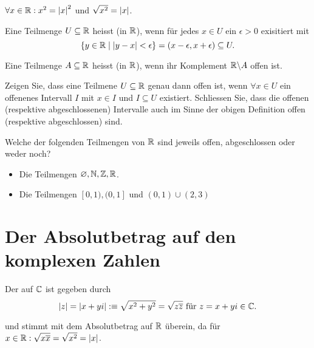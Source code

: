 \begin{ex} $\forall x \in \mathbb{R}: x^2 = \left|x\right|^2$ und $\sqrt{x^2} = \left|x\right|$.
\end{ex}

\begin{mydef}
  Eine Teilmenge $U \subseteq \mathbb{R}$ heisst  (in $\mathbb{R}$), wenn für jedes $x \in U$ ein $\epsilon >0$ exisitiert mit
  \[
    \{ y \in \mathbb{R} \mid \left|y-x\right| < \epsilon \} = (x-\epsilon, x + \epsilon) \subseteq U.
  \]

  Eine Teilmenge $A \subseteq \mathbb{R}$ heisst  (in $\mathbb{R}$), wenn ihr Komplement $\mathbb{R} \backslash A$ offen ist.
\end{mydef}

\begin{ex}
  Zeigen Sie, dass eine Teilmene $U \subseteq \mathbb{R}$ genau dann offen ist, wenn $\forall x \in U$ ein offenenes Intervall $I$ mit $x \in I$ und $I \subseteq U$ existiert. Schliessen Sie, dass die offenen (respektive abgeschlossenen) Intervalle auch im Sinne der obigen Definition offen (respektive abgeschlossen) sind.
\end{ex}

\begin{ex}
  Welche der folgenden Teilmengen von $\mathbb{R}$ sind jeweils offen, abgeschlossen oder weder noch?
  \begin{itemize}
    \item Die Teilmengen $\varnothing, \mathbb{N}, \mathbb{Z}, \mathbb{R}$.
    \item Die Teilmengen $[0,1), (0,1]$ und $(0,1) \cup (2,3)$
  \end{itemize}
\end{ex}

\section{Der Absolutbetrag auf den komplexen Zahlen}

\begin{mydef}[Absolutbetrag]
  Der  auf $\mathbb{C}$ ist gegeben durch
  \[
    \abs{z} = \abs{x + yi} :\equiv \sqrt{x^2 + y^2} = \sqrt{z \overline z} $ für $z=x+yi \in \compl.
  \]

  und stimmt mit dem Absolutbetrag auf $\mathbb{R}$ überein, da für $x \in \mathbb{R}: \sqrt{x \overline x} = \sqrt{x^2} = \left|x\right|$.
\end{mydef}

